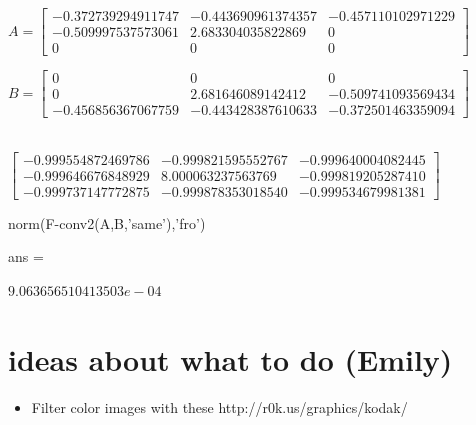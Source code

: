 \documentclass[12pt]{amsart}
\theoremstyle{definition}
\theoremstyle{remark}
\numberwithin{thm}{section}
\begin{document}
$
A =
\begin{bmatrix}
  -0.372739294911747  &-0.443690961374357 & -0.457110102971229\\
  -0.509997537573061  & 2.683304035822869 &                  0\\
                   0  &                 0 &                  0
\end{bmatrix}
$

$
B =
\begin{bmatrix}
                   0&                   0&                   0\\
                   0&   2.681646089142412&  -0.509741093569434\\
  -0.456856367067759&  -0.443428387610633&  -0.372501463359094
\end{bmatrix}
$

\\
$
\begin{bmatrix}
  -0.999554872469786  &-0.999821595552767  &-0.999640004082445\\
  -0.999646676848929  & 8.000063237563769  &-0.999819205287410\\
  -0.999737147772875  &-0.999878353018540  &-0.999534679981381
  \end{bmatrix}
$
  
  norm(F-conv2(A,B,'same'),'fro')

ans =

     $9.063656510413503e-04$

\section{ideas about what to do (Emily)}
\begin{itemize}

\item Filter color images with these 
http://r0k.us/graphics/kodak/

\end{itemize}
\end{document}

